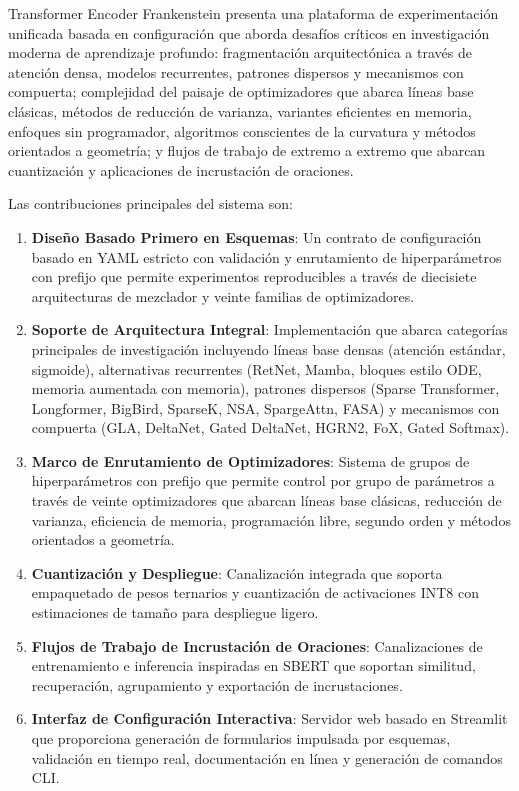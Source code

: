 \documentclass[11pt,a4paper]{article}
\begin{document}
Transformer Encoder Frankenstein presenta una plataforma de experimentación unificada basada en configuración que aborda desafíos críticos en investigación moderna de aprendizaje profundo: fragmentación arquitectónica a través de atención densa, modelos recurrentes, patrones dispersos y mecanismos con compuerta; complejidad del paisaje de optimizadores que abarca líneas base clásicas, métodos de reducción de varianza, variantes eficientes en memoria, enfoques sin programador, algoritmos conscientes de la curvatura y métodos orientados a geometría; y flujos de trabajo de extremo a extremo que abarcan cuantización y aplicaciones de incrustación de oraciones.

Las contribuciones principales del sistema son:
\begin{enumerate}[leftmargin=*]
    \item \textbf{Diseño Basado Primero en Esquemas}: Un contrato de configuración basado en YAML estricto con validación y enrutamiento de hiperparámetros con prefijo que permite experimentos reproducibles a través de diecisiete arquitecturas de mezclador y veinte familias de optimizadores.
    \item \textbf{Soporte de Arquitectura Integral}: Implementación que abarca categorías principales de investigación incluyendo líneas base densas (atención estándar, sigmoide), alternativas recurrentes (RetNet, Mamba, bloques estilo ODE, memoria aumentada con memoria), patrones dispersos (Sparse Transformer, Longformer, BigBird, SparseK, NSA, SpargeAttn, FASA) y mecanismos con compuerta (GLA, DeltaNet, Gated DeltaNet, HGRN2, FoX, Gated Softmax).
    \item \textbf{Marco de Enrutamiento de Optimizadores}: Sistema de grupos de hiperparámetros con prefijo que permite control por grupo de parámetros a través de veinte optimizadores que abarcan líneas base clásicas, reducción de varianza, eficiencia de memoria, programación libre, segundo orden y métodos orientados a geometría.
    \item \textbf{Cuantización y Despliegue}: Canalización integrada que soporta empaquetado de pesos ternarios y cuantización de activaciones INT8 con estimaciones de tamaño para despliegue ligero.
    \item \textbf{Flujos de Trabajo de Incrustación de Oraciones}: Canalizaciones de entrenamiento e inferencia inspiradas en SBERT que soportan similitud, recuperación, agrupamiento y exportación de incrustaciones.
    \item \textbf{Interfaz de Configuración Interactiva}: Servidor web basado en Streamlit que proporciona generación de formularios impulsada por esquemas, validación en tiempo real, documentación en línea y generación de comandos CLI.
\end{enumerate}
\end{document}
